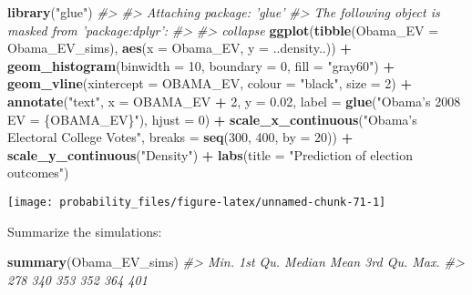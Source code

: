 \documentclass[]{book}
\newenvironment{Shaded}{\begin{snugshade}}{\end{snugshade}}
\newcommand{\CommentTok}[1]{\textcolor[rgb]{0.56,0.35,0.01}{\textit{#1}}}
\newcommand{\DataTypeTok}[1]{\textcolor[rgb]{0.13,0.29,0.53}{#1}}
\newcommand{\DecValTok}[1]{\textcolor[rgb]{0.00,0.00,0.81}{#1}}
\newcommand{\FloatTok}[1]{\textcolor[rgb]{0.00,0.00,0.81}{#1}}
\newcommand{\KeywordTok}[1]{\textcolor[rgb]{0.13,0.29,0.53}{\textbf{#1}}}
\newcommand{\NormalTok}[1]{#1}
\newcommand{\OperatorTok}[1]{\textcolor[rgb]{0.81,0.36,0.00}{\textbf{#1}}}
\newcommand{\StringTok}[1]{\textcolor[rgb]{0.31,0.60,0.02}{#1}}
\theoremstyle{definition}
\theoremstyle{definition}
\theoremstyle{definition}
\theoremstyle{remark}
\begin{document}
\begin{Shaded}
\begin{Highlighting}[]
\KeywordTok{library}\NormalTok{(}\StringTok{"glue"}\NormalTok{)}
\CommentTok{#> }
\CommentTok{#> Attaching package: 'glue'}
\CommentTok{#> The following object is masked from 'package:dplyr':}
\CommentTok{#> }
\CommentTok{#>     collapse}
\KeywordTok{ggplot}\NormalTok{(}\KeywordTok{tibble}\NormalTok{(}\DataTypeTok{Obama_EV =}\NormalTok{ Obama_EV_sims),}
       \KeywordTok{aes}\NormalTok{(}\DataTypeTok{x =}\NormalTok{ Obama_EV, }\DataTypeTok{y =}\NormalTok{ ..density..)) }\OperatorTok{+}
\StringTok{  }\KeywordTok{geom_histogram}\NormalTok{(}\DataTypeTok{binwidth =} \DecValTok{10}\NormalTok{, }\DataTypeTok{boundary =} \DecValTok{0}\NormalTok{, }\DataTypeTok{fill =} \StringTok{"gray60"}\NormalTok{) }\OperatorTok{+}
\StringTok{  }\KeywordTok{geom_vline}\NormalTok{(}\DataTypeTok{xintercept =}\NormalTok{ OBAMA_EV, }\DataTypeTok{colour =} \StringTok{"black"}\NormalTok{, }\DataTypeTok{size =} \DecValTok{2}\NormalTok{) }\OperatorTok{+}
\StringTok{  }\KeywordTok{annotate}\NormalTok{(}\StringTok{"text"}\NormalTok{, }\DataTypeTok{x =}\NormalTok{ OBAMA_EV }\OperatorTok{+}\StringTok{ }\DecValTok{2}\NormalTok{, }\DataTypeTok{y =} \FloatTok{0.02}\NormalTok{,}
           \DataTypeTok{label =} \KeywordTok{glue}\NormalTok{(}\StringTok{"Obama's 2008 EV = \{OBAMA_EV\}"}\NormalTok{), }\DataTypeTok{hjust =} \DecValTok{0}\NormalTok{) }\OperatorTok{+}
\StringTok{  }\KeywordTok{scale_x_continuous}\NormalTok{(}\StringTok{"Obama's Electoral College Votes"}\NormalTok{,}
                     \DataTypeTok{breaks =} \KeywordTok{seq}\NormalTok{(}\DecValTok{300}\NormalTok{, }\DecValTok{400}\NormalTok{, }\DataTypeTok{by =} \DecValTok{20}\NormalTok{)) }\OperatorTok{+}
\StringTok{  }\KeywordTok{scale_y_continuous}\NormalTok{(}\StringTok{"Density"}\NormalTok{) }\OperatorTok{+}
\StringTok{  }\KeywordTok{labs}\NormalTok{(}\DataTypeTok{title =} \StringTok{"Prediction of election outcomes"}\NormalTok{)}
\end{Highlighting}
\end{Shaded}

\begin{center}\texttt{[image: probability\_files/figure-latex/unnamed-chunk-71-1]} \end{center}

Summarize the simulations:

\begin{Shaded}
\begin{Highlighting}[]
\KeywordTok{summary}\NormalTok{(Obama_EV_sims)}
\CommentTok{#>    Min. 1st Qu.  Median    Mean 3rd Qu.    Max. }
\CommentTok{#>     278     340     353     352     364     401}
\end{Highlighting}
\end{Shaded}
\end{document}
